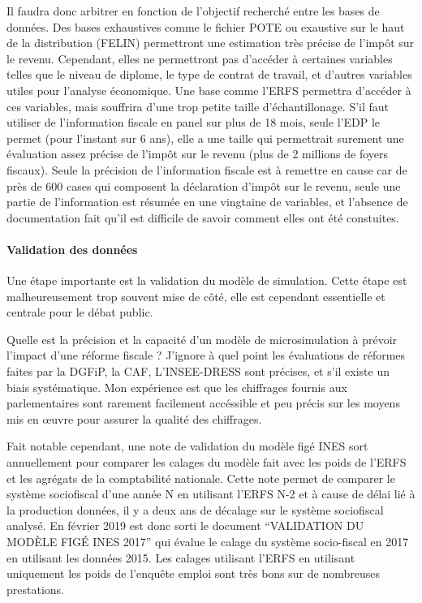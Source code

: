 Il faudra donc arbitrer en fonction de l'objectif recherché entre les
bases de données. Des bases exhaustives comme le fichier POTE ou
exaustive sur le haut de la distribution (FELIN) permettront une
estimation très précise de l'impôt sur le revenu. Cependant, elles ne
permettront pas d'accéder à certaines variables telles que le niveau de
diplome, le type de contrat de travail, et d'autres variables utiles
pour l'analyse économique. Une base comme l'ERFS permettra d'accéder à
ces variables, mais souffrira d'une trop petite taille d'échantillonage.
S'il faut utiliser de l'information fiscale en panel sur plus de 18
mois, seule l'EDP le permet (pour l'instant sur 6 ans), elle a une
taille qui permettrait surement une évaluation assez précise de l'impôt
sur le revenu (plus de 2 millions de foyers fiscaux). Seule la précision
de l'information fiscale est à remettre en cause car de près de 600
cases qui composent la déclaration d'impôt sur le revenu, seule une
partie de l'information est résumée en une vingtaine de variables, et
l'absence de documentation fait qu'il est difficile de savoir comment
elles ont été constuites.

\paragraph{Validation des données}

Une étape importante est la validation du modèle de simulation. Cette
étape est malheureusement trop souvent mise de côté, elle est cependant
essentielle et centrale pour le débat public.

Quelle est la précision et la capacité d'un modèle de microsimulation à
prévoir l'impact d'une réforme fiscale ? J'ignore à quel point les
évaluations de réformes faites par la DGFiP, la CAF, L'INSEE-DRESS sont
précises, et s'il existe un biais systématique. Mon expérience est que
les chiffrages fournis aux parlementaires sont rarement facilement
accéssible et peu précis sur les moyens mis en œuvre pour assurer la
qualité des chiffrages.

Fait notable cependant, une note de validation du modèle figé INES sort
annuellement pour comparer les calages du modèle fait avec les poids de
l'ERFS et les agrégats de la comptabilité nationale. Cette note permet
de comparer le système sociofiscal d'une année N en utilisant l'ERFS N-2
et à cause de délai lié à la production données, il y a deux ans de
décalage sur le système sociofiscal analysé. En février 2019 est donc
sorti le document ``VALIDATION DU MODÈLE FIGÉ INES 2017'' qui évalue le
calage du système socio-fiscal en 2017 en utilisant les données 2015.
Les calages utilisant l'ERFS en utilisant uniquement les poids de
l'enquête emploi sont très bons sur de nombreuses prestations.

